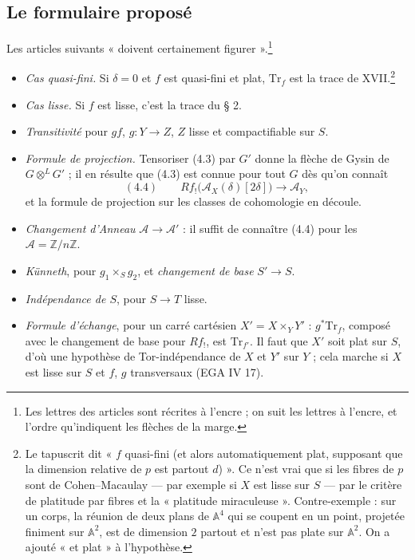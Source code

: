 \documentclass[11pt,a4paper]{article}
\begin{document}
\subsection*{Le formulaire proposé}

Les articles suivants « doivent certainement figurer ».\footnote{Les lettres
des articles sont récrites à l'encre ; on suit les lettres à l'encre, et
l'ordre qu'indiquent les flèches de la marge.}

\begin{itemize}
\item[a)] \emph{Cas quasi-fini.} Si $\delta = 0$ et $f$ est quasi-fini et plat,
$\mathrm{Tr}_f$ est la trace de XVII.\footnote{Le tapuscrit dit « $f$
quasi-fini (et alors automatiquement plat, supposant que la dimension relative
de $p$ est partout $d$) ». Ce n'est vrai que si les fibres de $p$ sont de
Cohen--Macaulay --- par exemple si $X$ est lisse sur $S$ --- par le critère de
platitude par fibres et la « platitude miraculeuse ». Contre-exemple : sur un
corps, la réunion de deux plans de $\mathbb{A}^4$ qui se coupent en un point,
projetée finiment sur $\mathbb{A}^2$, est de dimension $2$ partout et n'est
pas plate sur $\mathbb{A}^2$. On a ajouté « et plat » à l'hypothèse.}
\item[b)] \emph{Cas lisse.} Si $f$ est lisse, c'est la trace du § 2.
\item[c)] \emph{Transitivité} pour $gf$, $g\colon Y \to Z$, $Z$ lisse et
compactifiable sur $S$.
\item[d)] \emph{Formule de projection.} Tensoriser (4.3) par $G'$ donne la
flèche de Gysin de $G \otimes^L G'$ ; il en résulte que (4.3) est connue pour
tout $G$ dès qu'on connaît
\[
(4.4)\qquad Rf_!\bigl(\mathcal{A}_X(\delta)[2\delta]\bigr) \longrightarrow
\mathcal{A}_Y,
\]
et la formule de projection sur les classes de cohomologie en découle.
\item[e)] \emph{Changement d'Anneau} $\mathcal{A} \to \mathcal{A}'$ : il suffit
de connaître (4.4) pour les $\mathcal{A} = \mathbb{Z}/n\mathbb{Z}$.
\item[f)] \emph{Künneth}, pour $g_1 \times_S g_2$, et \emph{changement de base}
$S' \to S$.
\item[g)] \emph{Indépendance de $S$}, pour $S \to T$ lisse.
\item[h)] \emph{Formule d'échange}, pour un carré cartésien
$X' = X \times_Y Y'$ : $g^*\mathrm{Tr}_f$, composé avec le changement de base
pour $Rf_!$, est $\mathrm{Tr}_{f'}$. Il faut que $X'$ soit plat sur $S$, d'où
une hypothèse de Tor-indépendance de $X$ et $Y'$ sur $Y$ ; cela marche si $X$
est lisse sur $S$ et $f$, $g$ transversaux (EGA IV 17).
\end{itemize}
\end{document}
